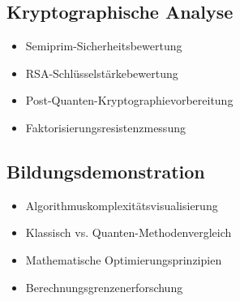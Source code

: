 	\subsection{Kryptographische Analyse}
	\begin{itemize}
		\item Semiprim-Sicherheitsbewertung
		\item RSA-Schlüsselstärkebewertung
		\item Post-Quanten-Kryptographievorbereitung
		\item Faktorisierungsresistenzmessung
	\end{itemize}
	
	\subsection{Bildungsdemonstration}
	\begin{itemize}
		\item Algorithmuskomplexitätsvisualisierung
		\item Klassisch vs. Quanten-Methodenvergleich
		\item Mathematische Optimierungsprinzipien
		\item Berechnungsgrenzenerforschung
	\end{itemize}
	
